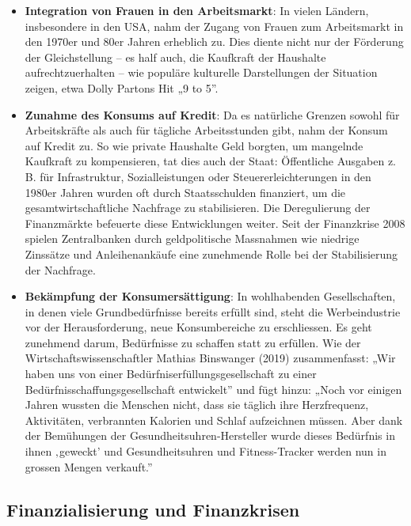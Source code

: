 \documentclass[
  nswissgerman,
  a4paper,
  DIV=11,
  numbers=noendperiod,
  oneside,
  openany]{scrreprt}
\begin{document}
\begin{itemize}
\item
  \textbf{Integration von Frauen in den Arbeitsmarkt}: In vielen
  Ländern, insbesondere in den USA, nahm der Zugang von Frauen zum
  Arbeitsmarkt in den 1970er und 80er Jahren erheblich zu. Dies diente
  nicht nur der Förderung der Gleichstellung -- es half auch, die
  Kaufkraft der Haushalte aufrechtzuerhalten -- wie populäre kulturelle
  Darstellungen der Situation zeigen, etwa Dolly Partons Hit „9 to 5''.
\item
  \textbf{Zunahme des Konsums auf Kredit}: Da es natürliche Grenzen
  sowohl für Arbeitskräfte als auch für tägliche Arbeitsstunden gibt,
  nahm der Konsum auf Kredit zu. So wie private Haushalte Geld borgten,
  um mangelnde Kaufkraft zu kompensieren, tat dies auch der Staat:
  Öffentliche Ausgaben z. B. für Infrastruktur, Sozialleistungen oder
  Steuererleichterungen in den 1980er Jahren wurden oft durch
  Staatsschulden finanziert, um die gesamtwirtschaftliche Nachfrage zu
  stabilisieren. Die Deregulierung der Finanzmärkte befeuerte diese
  Entwicklungen weiter. Seit der Finanzkrise 2008 spielen Zentralbanken
  durch geldpolitische Massnahmen wie niedrige Zinssätze und
  Anleihenankäufe eine zunehmende Rolle bei der Stabilisierung der
  Nachfrage.
\item
  \textbf{Bekämpfung der Konsumersättigung}: In wohlhabenden
  Gesellschaften, in denen viele Grundbedürfnisse bereits erfüllt sind,
  steht die Werbeindustrie vor der Herausforderung, neue Konsumbereiche
  zu erschliessen. Es geht zunehmend darum, Bedürfnisse zu schaffen
  statt zu erfüllen. Wie der Wirtschaftswissenschaftler Mathias
  Binswanger (2019) zusammenfasst: „Wir haben uns von einer
  Bedürfniserfüllungsgesellschaft zu einer
  Bedürfnisschaffungsgesellschaft entwickelt'' und fügt hinzu: „Noch vor
  einigen Jahren wussten die Menschen nicht, dass sie täglich ihre
  Herzfrequenz, Aktivitäten, verbrannten Kalorien und Schlaf aufzeichnen
  müssen. Aber dank der Bemühungen der Gesundheitsuhren-Hersteller wurde
  dieses Bedürfnis in ihnen ‚geweckt' und Gesundheitsuhren und
  Fitness-Tracker werden nun in grossen Mengen verkauft.''
\end{itemize}

\subsection{Finanzialisierung und
Finanzkrisen}\label{finanzialisierung-und-finanzkrisen}
\end{document}
